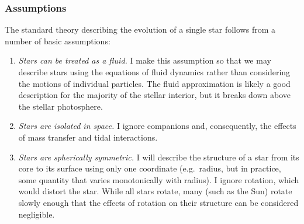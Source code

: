 \subsubsection*{Assumptions}
The standard theory describing the evolution of a single star follows from a number of basic assumptions:
\begin{enumerate}%
    \item \emph{Stars can be treated as a fluid.} 
    I make this assumption so that we may describe stars using the equations of fluid dynamics rather than considering the motions of individual particles. 
    The fluid approximation is likely a good description for the majority of the stellar interior, but it breaks down above the stellar photosphere. 
    \item \emph{Stars are isolated in space.} 
    I ignore companions and, consequently, the effects of mass transfer and tidal interactions. 
    \item \emph{Stars are spherically symmetric.} 
    I will describe the structure of a star from its core to its surface using only one coordinate (e.g.~radius, but in practice, some quantity that varies monotonically with radius). 
    I ignore rotation, which would distort the star. 
    While all stars rotate, many (such as the Sun) rotate slowly enough that the effects of rotation on their structure can be considered negligible. 

\end{enumerate}
